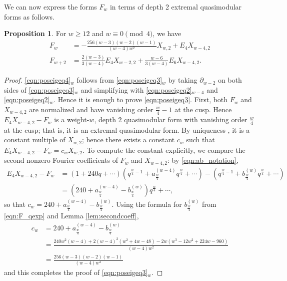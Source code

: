 \documentclass[10pt,reqno]{amsproc}
\newcommand{\1}{\mathds{1}}	%
\theoremstyle{definition}
\newtheorem{proposition}[theorem]{Proposition}
\theoremstyle{remark}
\begin{document}
We can now express the forms $F_w$ in terms of depth 2 extremal quasimodular forms as follows.
\begin{proposition}
\label{prop:ext2poseig}    
For $w \geq 12$ and $w \equiv 0\pmod{4}$, we have
\begin{align}
    F_{w} &= - \frac{256(w-3)(w-2)(w-1)}{(w-4)w^2} X_{w, 2} + E_4 X_{w-4,2} \label{eqn:poseigeq3} \\
    F_{w+2} &= \frac{2(w - 3)}{3(w-4)} E_4 X_{w-2, 2} + \frac{w-6}{3(w-4)} E_6 X_{w-4, 2}. \label{eqn:poseigeq4}
\end{align}
\end{proposition}
\begin{proof}
\eqref{eqn:poseigeq4}${}_{w}$ follows from \eqref{eqn:poseigeq3}${}_{w}$ by taking $\partial_{w-2}$ on both sides of \eqref{eqn:poseigeq3}${}_{w}$ and simplifying with \eqref{eqn:poseigeq2}${}_{w-4}$ and \eqref{eqn:poseigeq2}${}_{w}$.
Hence it is enough to prove \eqref{eqn:poseigeq3}.
First, both $F_{w}$ and $X_{w-4, 2}$ are normalized and have vanishing order $\frac{w}{4} - 1$ at the cusp.
Hence $E_{4} X_{w-4, 2} - F_{w}$ is a weight-$w$, depth 2 quasimodular form with vanishing order $\frac{w}{4}$ at the cusp; that is, it is an extremal quasimodular form.
By uniqueness \cite{pellarin2020extremal}, it is a constant multiple of $X_{w, 2}$; hence there exists a constant $c_{w}$ such that $E_{4} X_{w-4, 2} - F_{w} = c_{w}X_{w, 2}$.
To compute the constant explicitly, we compare the second nonzero Fourier coefficients of $F_{w}$ and $X_{w-4, 2}$: by \eqref{eqn:ab_notation},
\begin{align*}
    E_{4}X_{w-4, 2} - F_{w} &= \left(1 + 240q + \cdots \right)\left(q^{\frac{w}{4} - 1} + a_{\frac{w}{4}}^{(w-4)} q^{\frac{w}{4}} + \cdots\right) - \left(q^{ \frac{w}{4}- 1} + b_{\frac{w}{4}}^{(w)}q^{\frac{w}{4}} + \cdots\right) \\
    &=\left(240 + a_{\frac{w}{4}}^{(w-4)} - b_{\frac{w}{4}}^{(w)}\right)q^{\frac{w}{4}} + \cdots,
\end{align*}
so that $c_{w} = 240 + a_{\frac{w}{4}}^{(w-4)} - b_{\frac{w}{4}}^{(w)}$.
Using the formula for $b_{\frac{w}{4}}^{(w)}$ from \eqref{eqn:F_qexp} and Lemma \ref{lem:secondcoeff},
\begin{align*}
c_{w} &= 240 + a_{\frac{w}{4}}^{(w-4)} - b_{\frac{w}{4}}^{(w)} \\
&= \frac{240w^2(w-4) + 2(w-4)^{2}(w^2 + 4w - 48) - 2w(w^3 - 12w^2 + 224w - 960)}{(w-4)w^2} \\
&= \frac{256(w-3)(w-2)(w-1)}{(w-4)w^2}
\end{align*}
and this completes the proof of \eqref{eqn:poseigeq3}${}_{w}$.
\end{proof}
\end{document}
